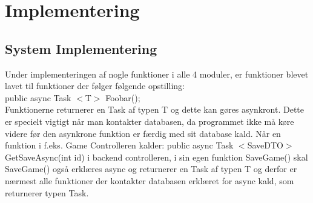 \section{Implementering}
\subsection{System Implementering}
Under implementeringen af nogle funktioner i alle 4 moduler, er funktioner blevet lavet til funktioner der følger følgende opstilling:\\
public async Task $<$T$>$ Foobar();\\ 
Funktionerne returnerer en Task af typen T og dette kan gøres asynkront. Dette er specielt vigtigt når man kontakter databasen, da programmet ikke må køre videre før den asynkrone funktion er færdig med sit database kald. Når en funktion i f.eks. Game Controlleren kalder: public async Task $<$SaveDTO$>$ GetSaveAsync(int id) i backend controlleren, i sin egen funktion SaveGame() skal SaveGame() også erklæres async og returnerer en Task af typen T og derfor er nærmest alle funktioner der kontakter databasen erklæret for async kald, som returnerer typen Task.





